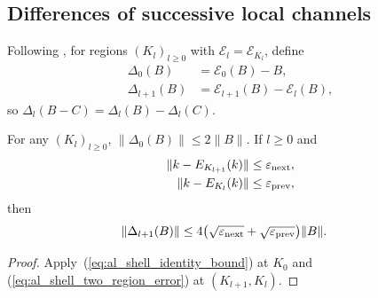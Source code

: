 \subsection{Differences of successive local channels}

\begin{definition}
    \label{def:al_local_channel_shell}
    \leanok
    Following \cite[Section~10]{OpenAI2026AreaLaw}, for regions
    $(K_l)_{l\ge0}$ with $\mathcal E_l=\mathcal E_{K_l}$, define
    \begin{align}
        \Delta_0(B)     & =\mathcal E_0(B)-B,
        \label{eq:al_shell_zero}                                \\
        \Delta_{l+1}(B) & =\mathcal E_{l+1}(B)-\mathcal E_l(B),
        \label{eq:al_shell_successor}
    \end{align}
    so $\Delta_l(B-C)=\Delta_l(B)-\Delta_l(C)$.
\end{definition}

\begin{lemma}
    \label{thm:al_channel_shell_norm}
    \leanok
    For any $(K_l)_{l\ge0}$, $\|\Delta_0(B)\|\le2\|B\|$. If $l\ge0$ and
    \begin{align}
        \|k-E_{K_{l+1}}(k)\| & \le\varepsilon_{\rm next},
        \label{eq:al_shell_next_error}                    \\
        \|k-E_{K_l}(k)\|     & \le\varepsilon_{\rm prev},
        \label{eq:al_shell_previous_error}
    \end{align}
    then
    \begin{align}
        \|\Delta_{l+1}(B)\|
         & \le4\bigl(\sqrt{\varepsilon_{\rm next}}
        +\sqrt{\varepsilon_{\rm prev}}\bigr)\|B\|.
        \label{eq:al_shell_successor_bound}
    \end{align}
\end{lemma}
\begin{proof}
    \leanok
    Apply~(\ref{eq:al_shell_identity_bound}) at $K_0$ and
    (\ref{eq:al_shell_two_region_error}) at $(K_{l+1},K_l)$.
\end{proof}

